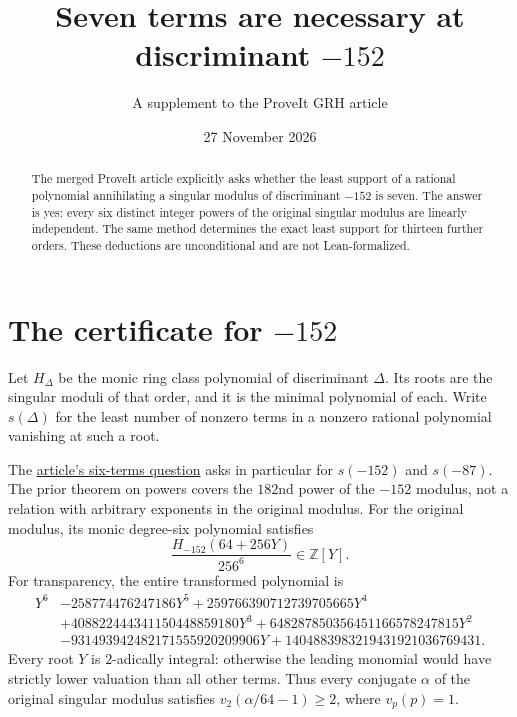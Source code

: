 \documentclass[11pt]{article}
\title{\vspace{-1.7em}Seven terms are necessary at discriminant \(-152\)}
\author{A supplement to the ProveIt GRH article}
\date{27 November 2026}
\newcommand{\Z}{\mathbb Z}
\begin{document}
\maketitle
\begin{abstract}
The merged ProveIt article explicitly asks whether the least support
of a rational polynomial annihilating a singular modulus of discriminant
\(-152\) is seven. The answer is yes: every six distinct integer powers
of the original singular modulus are linearly independent.
The same method determines the exact least support for thirteen further
orders. These deductions are unconditional and are not Lean-formalized.
\end{abstract}

\section{The certificate for \(-152\)}
Let \(H_\Delta\) be the monic ring class polynomial of discriminant
\(\Delta\). Its roots are the singular moduli of that order, and it is
the minimal polynomial of each. Write \(s(\Delta)\) for the least
number of nonzero terms in a nonzero rational polynomial vanishing
at such a root.

The \href{https://github.com/VladimirReshetnikov/ProveIt/blob/e7f7a226563fb14c6f0b796322e43b048c548953/Analysis/GeneralizedRiemannHypothesis/Article/sections/smd.tex#L1552-L1563}{article's six-terms question}
asks in particular for \(s(-152)\) and \(s(-87)\). The prior
theorem on powers covers the \(182\)nd power of the \(-152\) modulus,
not a relation with arbitrary exponents in the original modulus.
For the original modulus, its monic degree-six polynomial satisfies
\[
 \frac{H_{-152}(64+256Y)}{256^6}\in\Z[Y].
\]
For transparency, the entire transformed polynomial is
\[
\begin{aligned}
Y^6&-258774476247186Y^5+259766390712739705665Y^4\\
 &+408822444341150448859180Y^3+648287850356451166578247815Y^2\\
 &-931493942482171555920209906Y+1404883983219431921036769431.
\end{aligned}
\]
Every root \(Y\) is \(2\)-adically integral: otherwise the leading
monomial would have strictly lower valuation than all other terms.
Thus every conjugate \(\alpha\) of the original singular modulus
satisfies \(v_2(\alpha/64-1)\ge2\), where \(v_p(p)=1\).
\end{document}
